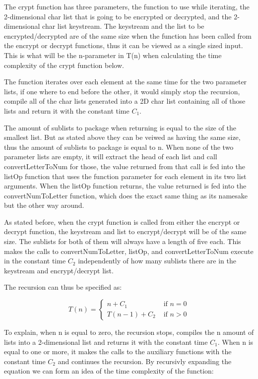﻿\documentclass[12pt,a4paper]{article}
\begin{document}
The crypt function has three parameters, the function to use while iterating, the 2-dimensional char list that is going to be encrypted or decrypted, and the 2-dimensional char list keystream.
The keystream and the list to be encrypted/decrypted are of the same size when the function has been called from the encrypt or decrypt functions, thus it can be viewed as a single sized input.
This is what will be the n-parameter in T(n) when calculating the time complexity of the crypt function below.

The function iterates over each element at the same time for the two parameter lists, if one where to end before the other, it would simply stop the recursion, compile all of the char lists generated 
into a 2D char list containing all of those lists and return it with the constant time \(C_1\). 

The amount of sublists to package when returning is equal to the size of the smallest list.
But as stated above they can be veiwed as having the same size, thus the amount of sublists to package is equal to n.
When none of the two parameter lists are empty, it will extract the head of each list and call convertLetterToNum for those, the value returned from that
call is fed into the listOp function that uses the function parameter for each element in its two list arguments.
When the listOp function returns, the value returned is fed into the convertNumToLetter function, which does the exact same thing as its namesake but the other
way around.

As stated before, when the crypt function is called from either the encrypt or decrypt function, the keystream and list to encrypt/decrypt will be of the same size.
The sublists for both of them will always have a length of five each. 
This makes the calls to convertNumToLetter, listOp, and convertLetterToNum execute in the constant time \(C_2\) independently of how many sublists there are in the keystream and encrypt/decrypt list.

The recursion can thus be specified as:

\begin{equation}
T(n)=
\begin{cases}
n + C_1  &  \text{ if } n = 0 \\
T(n-1) + C_2  &  \text{ if } n > 0
\end{cases}
\end{equation}

To explain, when n is equal to zero, the recursion stops, compiles the n amount of lists into a 2-dimensional list and returns it with the constant time \(C_1\).
When n is equal to one or more, it makes the calls to the auxiliary functions with the constant time \(C_2\) and continues the recursion.
By recursivly expanding the equation we can form an idea of the time complexity of the function:
\end{document}
